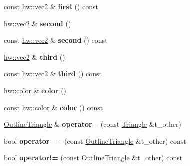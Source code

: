 \begin{DoxyCompactItemize}
const \mbox{\hyperlink{structhw_1_1vec2}{hw\+::vec2}} \& {\bfseries first} () const
\item 
\mbox{\label{classdummy__api_1_1OutlineTriangle_a76a7b77d1c319b892c0262e9a6913787}} 
\mbox{\hyperlink{structhw_1_1vec2}{hw\+::vec2}} \& {\bfseries second} ()
\item 
\mbox{\label{classdummy__api_1_1OutlineTriangle_ae17d583234c2848651a530e5b7e15211}} 
const \mbox{\hyperlink{structhw_1_1vec2}{hw\+::vec2}} \& {\bfseries second} () const
\item 
\mbox{\label{classdummy__api_1_1OutlineTriangle_a62d62bc4e94cb7328a2f0d312f5e8f42}} 
\mbox{\hyperlink{structhw_1_1vec2}{hw\+::vec2}} \& {\bfseries third} ()
\item 
\mbox{\label{classdummy__api_1_1OutlineTriangle_a1cab7aa95429f307318afd9b61d35ee3}} 
const \mbox{\hyperlink{structhw_1_1vec2}{hw\+::vec2}} \& {\bfseries third} () const
\item 
\mbox{\label{classdummy__api_1_1OutlineTriangle_aae7670f1811e60ddec99a060d5498f14}} 
\mbox{\hyperlink{structhw_1_1color}{hw\+::color}} \& {\bfseries color} ()
\item 
\mbox{\label{classdummy__api_1_1OutlineTriangle_a2f91a83683143c77f5743081c9bd8493}} 
const \mbox{\hyperlink{structhw_1_1color}{hw\+::color}} \& {\bfseries color} () const
\item 
\mbox{\label{classdummy__api_1_1OutlineTriangle_a4c8e892a463aefee5d823f7eab5b0222}} 
\mbox{\hyperlink{classdummy__api_1_1OutlineTriangle}{Outline\+Triangle}} \& {\bfseries operator=} (const \mbox{\hyperlink{classdummy__api_1_1Triangle}{Triangle}} \&t\+\_\+other)
\item 
\mbox{\label{classdummy__api_1_1OutlineTriangle_a90541badba79c716f6ccbeb971d02cb1}} 
bool {\bfseries operator==} (const \mbox{\hyperlink{classdummy__api_1_1OutlineTriangle}{Outline\+Triangle}} \&t\+\_\+other) const
\item 
\mbox{\label{classdummy__api_1_1OutlineTriangle_afeadae73e3885707599aee4a3702da60}} 
bool {\bfseries operator!=} (const \mbox{\hyperlink{classdummy__api_1_1OutlineTriangle}{Outline\+Triangle}} \&t\+\_\+other) const
\end{DoxyCompactItemize}


